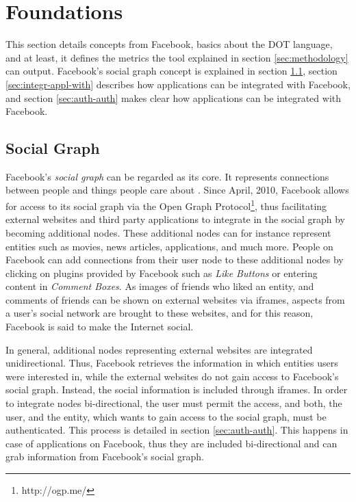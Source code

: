 \documentclass[preprint,12pt]{elsarticle}
\begin{document}
\section{Foundations}
\label{sec:background}
This section details concepts from Facebook, basics about the
\ac{DOT} language, and at least, it defines the metrics the tool
explained in section \ref{sec:methodology} can output. Facebook's
social graph concept is explained in 
section \ref{sec:social-graph}, section \ref{sec:integr-appl-with}
describes how applications can be integrated with Facebook, and
section \ref{sec:auth-auth} makes clear  how applications can be
integrated with Facebook.

\subsection{Social Graph}
\label{sec:social-graph}
Facebook's \textit{social graph} can be regarded as its core. It
represents connections between people and things people care about 
\cite{facebookDev}. Since April, 2010, Facebook allows for access to its
social graph via the Open Graph Protocol\footnote{http://ogp.me/}, thus facilitating
external websites and third party applications to integrate in the social graph by becoming
additional nodes\cite{facebookDev2}. These additional nodes can for
instance represent entities such as movies, news articles,
applications, and much more. People on Facebook can add connections
from their user node to these additional nodes by clicking on plugins
provided by Facebook such as \textit{Like Buttons} or entering content in \textit{Comment
  Boxes}.  \cite{facebookDev2} As images of friends who liked an
entity, and comments of friends can be shown on external websites via
iframes, aspects from a user's social network are brought to these
websites, and for this reason, Facebook is said to make the Internet social.

In general, additional nodes representing external websites are integrated
unidirectional. Thus, Facebook retrieves the information in which
entities users were interested in, while the external websites do not
gain access to Facebook's social graph. Instead, the social
information is included through iframes.
In order to integrate nodes bi-directional, the user must permit the
access, and both, the user, and the entity, which wants to gain access
to the social graph, must be authenticated. This process is detailed in
section \ref{sec:auth-auth}. This happens in case of applications on
Facebook, thus they are included bi-directional and can grab
information from Facebook's social graph.
\end{document}
